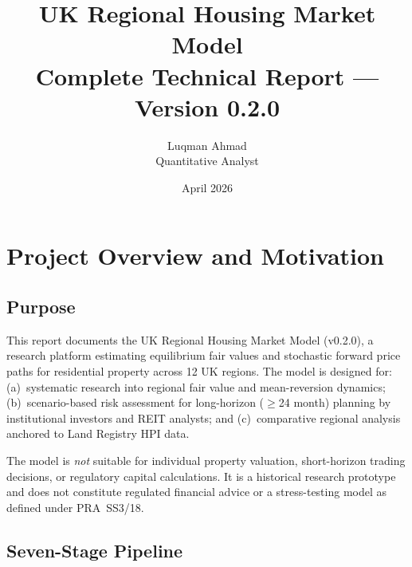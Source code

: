 \documentclass[11pt,a4paper]{article}
\title{%
  \textbf{UK Regional Housing Market Model}\\[4pt]
  \large Complete Technical Report --- Version 0.2.0
}
\author{Luqman Ahmad \\ \small Quantitative Analyst}
\date{April 2026}
\theoremstyle{plain}
\theoremstyle{definition}
\begin{document}
\maketitle
\thispagestyle{empty}
\tableofcontents
\newpage

\section{Project Overview and Motivation}

\subsection{Purpose}

This report documents the UK Regional Housing Market Model (v0.2.0), a
research platform estimating equilibrium fair values and stochastic forward
price paths for residential property across 12 UK regions.  The model is
designed for: (a)~systematic research into regional fair value and
mean-reversion dynamics; (b)~scenario-based risk assessment for long-horizon
($\geq$24 month) planning by institutional investors and REIT analysts; and
(c)~comparative regional analysis anchored to Land Registry HPI data.

The model is \emph{not} suitable for individual property valuation,
short-horizon trading decisions, or regulatory capital calculations.  It is
a historical research prototype and does not constitute regulated financial
advice or a stress-testing model as defined under PRA~SS3/18.

\subsection{Seven-Stage Pipeline}
\end{document}
